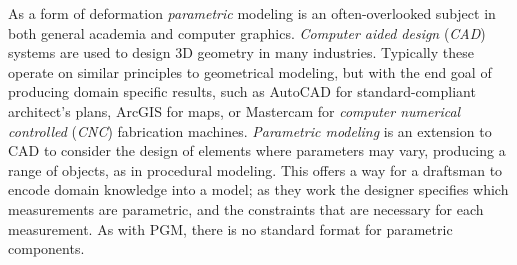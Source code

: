 





As a form of deformation \emph{parametric} modeling is an often-overlooked subject in both general academia and computer graphics\cite{Havemann:2005:GMM}. \emph{Computer aided design} (\emph{CAD}) systems are used to design 3D geometry in many industries. Typically these operate on similar principles to geometrical modeling, but with the end goal of producing domain specific results, such as AutoCAD\cite{AutoCAD} for standard-compliant architect's plans, ArcGIS\cite{ArcGIS} for maps, or Mastercam\cite{Mastercam} for \emph{computer numerical controlled} (\emph{CNC}) fabrication machines. \emph{Parametric modeling} is an extension to CAD to consider the design of elements where parameters may vary, producing a range of objects, as in procedural modeling. This offers a way for a draftsman to encode domain knowledge into a model\cite{Anderl96};  as they work the designer specifies which measurements are parametric, and the constraints that are necessary for each measurement. As with PGM, there is no standard format for parametric components\cite{Lee06}.



